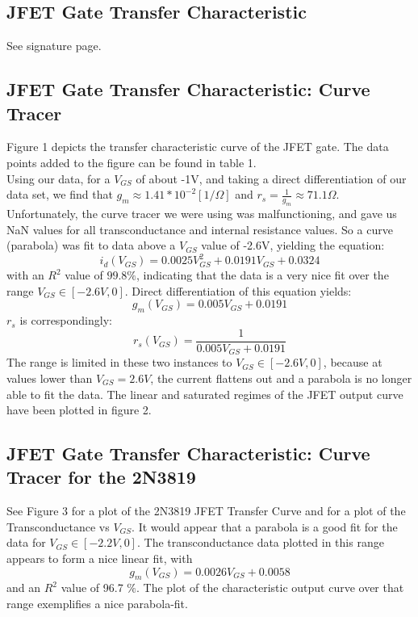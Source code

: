 \documentclass{article}
\begin{document}
\subsection{JFET Gate Transfer Characteristic}
    See signature page.
    
\subsection{JFET Gate Transfer Characteristic: Curve Tracer}
    Figure 1 depicts the transfer characteristic curve of the JFET gate. The data points added to the figure can be found in table 1. \\ Using our data, for a $V_{GS}$ of about -1V, and taking a direct differentiation of our data set, we find that $g_m \approx 1.41*10^{-2} [1/\Omega]$ and $r_s = \frac{1}{g_m} \approx 71.1 \Omega$. Unfortunately, the curve tracer we were using was malfunctioning, and gave us NaN values for all transconductance and internal resistance values. So a curve (parabola) was fit to data above a $V_{GS}$ value of -2.6V, yielding the equation:\\
    \begin{equation}
        i_d(V_{GS}) = 0.0025V_{GS}^{2} + 0.0191V_{GS} + 0.0324
    \end{equation}
    with an $R^{2}$ value of $99.8\%$, indicating that the data is a very nice fit over the range $V_{GS}\in [-2.6V,0]$. Direct differentiation of this equation yields:
    \begin{equation}
        g_m(V_{GS}) = 0.005V_{GS} + 0.0191
    \end{equation}
    $r_s$ is correspondingly:
    \begin{equation}
        r_s(V_{GS}) = \frac{1}{0.005V_{GS} + 0.0191}
    \end{equation}
    The range is limited in these two instances to $V_{GS}\in [-2.6V,0]$, because at values lower than $V_{GS} = 2.6V$, the current flattens out and a parabola is no longer able to fit the data. The linear and saturated regimes of the JFET output curve have been plotted in figure 2.

\subsection{JFET Gate Transfer Characteristic: Curve Tracer for the 2N3819}
    See Figure 3 for a plot of the 2N3819 JFET Transfer Curve and for a plot of the Transconductance vs $V_{GS}$. It would appear that a parabola is a good fit for the data for $V_{GS}\in [-2.2V,0]$. The transconductance data plotted in this range appears to form a nice linear fit, with \begin{equation}
        g_m(V_{GS}) = 0.0026V_{GS} + 0.0058
    \end{equation}
    and an $R^{2}$ value of 96.7 $\%$. The plot of the characteristic output curve over that range exemplifies a nice parabola-fit. 
    
\end{document}
